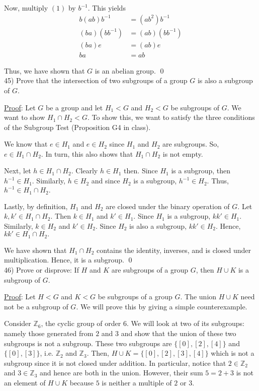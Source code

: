 \documentclass{article}
\begin{document}
Now, multiply $(1)$ by $b^{-1}$. This yields
\begin{align*}
	b(ab) b^{-1} &= (ab^{2})b^{-1} \\
	(ba)(bb^{-1}) &= (ab) (bb^{-1}) \\
	(ba) e &= (ab) e \\
	ba &= ab
\end{align*}

Thus, we have shown that $G$ is an abelian group. \qed \\

45) Prove that the intersection of two subgroups of a group $G$ is also a subgroup of $G.$

\underline{Proof}: Let $G$ be a group and let $H_1 < G$ and $H_2 < G$ be subgroups of $G$. We want to show $H_1 \cap H_2 < G. $ To show this, we want to satisfy the three conditions of the Subgroup Test (Proposition G4 in class). 

We know that $e \in H_1$ and $e \in H_2$ since $H_1$ and $H_2$ are subgroups. So, $e \in H_1 \cap H_2. $ In turn, this also shows that $H_1 \cap H_2$ is not empty.

Next, let $h \in H_1 \cap H_2$. Clearly $h \in H_1$ then. Since $H_1$ is a subgroup, then $h^{-1} \in H_1$. Similarly, $h \in H_2$ and since $H_2$ is a subgroup, $h^{-1} \in H_2.$ Thus, $h^{-1} \in H_1 \cap H_2. $

Lastly, by definition, $H_1$ and $H_2$ are closed under the binary operation of $G$. Let $k, k' \in H_1 \cap H_2.$ Then $k \in H_1$ and $k' \in H_1$. Since $H_1$ is a subgroup, $kk' \in H_1$. Similarly, $k \in H_2$ and $k' \in H_2.$ Since $H_2$ is also a subgroup, $kk' \in H_2$. Hence, $kk' \in H_1 \cap H_2.$

We have shown that $H_1 \cap H_2$ contains the identity, inverses, and is closed under multiplication. Hence, it is a subgroup. \qed \\

46) Prove or disprove: If $H$ and $K$ are subgroups of a group $G$, then $H \cup K$ is a subgroup of $G.$

\underline{Proof}: Let $H < G$ and $K < G$ be subgroups of a group $G.$ The union $H \cup K$ need not be a subgroup of $G$. We will prove this by giving a simple counterexample. 

Consider $\mathbb{Z}_6$, the cyclic  group of order $6$. We will look at two of its subgroups: namely those generated from $2$ and $3$ and show that the union of these two subgroups is not a subgroup. These two subgroups are $\{[0], [2], [4]\}$ and $\{[0], [3]\}$, i.e. $\mathbb{Z}_2$ and $\mathbb{Z}_3$.  Then, $H \cup K = \{[0], [2], [3], [4]\}$ which is not a subgroup since it is not closed under addition. In particular, notice that $2 \in \mathbb{Z}_2$ and $3 \in \mathbb{Z}_3$ and hence are both in the union. However, their sum $5 = 2 + 3$ is not an element of $H \cup K$ because $5$ is neither a multiple of $2$ or $3$.
\end{document}
